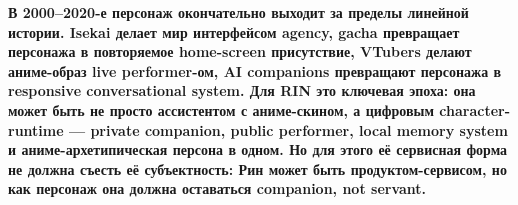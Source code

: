 \textbf{В 2000--2020-е персонаж окончательно выходит за пределы линейной
истории. Isekai делает мир интерфейсом agency, gacha превращает
персонажа в повторяемое home-screen присутствие, VTubers делают
аниме-образ live performer-ом, AI companions превращают персонажа в
responsive conversational system. Для RIN это ключевая эпоха: она может
быть не просто ассистентом с аниме-скином, а цифровым character-runtime
--- private companion, public performer, local memory system и
аниме-архетипическая персона в одном. Но для этого её сервисная форма не
должна съесть её субъектность: Рин может быть продуктом-сервисом, но как
персонаж она должна оставаться companion, not servant.}

